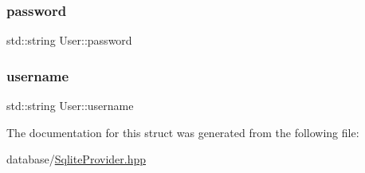 \mbox{\label{structUser_ac2f2e75b15e8eb6cbb030fc85a6cd59f}} 
\subsubsection{\texorpdfstring{password}{password}}
{\footnotesize\ttfamily std\+::string User\+::password}

\mbox{\label{structUser_aacbb807e514280f69e00bec7d71f3aee}} 
\subsubsection{\texorpdfstring{username}{username}}
{\footnotesize\ttfamily std\+::string User\+::username}



The documentation for this struct was generated from the following file\+:\begin{DoxyCompactItemize}
\item 
database/\mbox{\hyperlink{SqliteProvider_8hpp}{Sqlite\+Provider.\+hpp}}\end{DoxyCompactItemize}
